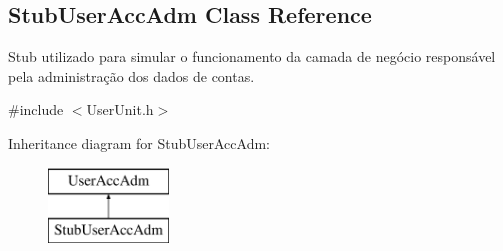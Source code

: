 \hypertarget{classStubUserAccAdm}{\subsection{Stub\-User\-Acc\-Adm Class Reference}
\label{d3/d88/classStubUserAccAdm}
}


Stub utilizado para simular o funcionamento da camada de negócio responsável pela administração dos dados de contas.  




{\ttfamily \#include $<$User\-Unit.\-h$>$}

Inheritance diagram for Stub\-User\-Acc\-Adm\-:\begin{figure}[H]
\begin{center}
\leavevmode
\includegraphics[height=2.000000cm]{d3/d88/classStubUserAccAdm}
\end{center}
\end{figure}
